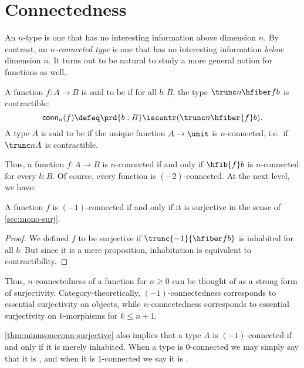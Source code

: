 \section{Connectedness}
\label{sec:connectivity}

An $n$-type is one that has no interesting information above dimension $n$.
By contrast, an \emph{$n$-connected type} is one that has no interesting information \emph{below} dimension $n$.
It turns out to be natural to study a more general notion for functions as well.

\begin{defn}
A function $f:A\to B$ is said to be 
%
%
if for all $b:B$, the type $\trunc n{\hfiber f b}$ is contractible:
\begin{equation*}
  \mathsf{conn}_n(f)\defeq \prd{b:B}\iscontr(\trunc n{\hfiber{f}b}).
\end{equation*}
A type $A$ is said to be 
%
%
 if the unique function $A\to\unit$ is $n$-connected, i.e.\ if $\trunc nA$ is contractible.
\end{defn}

Thus, a function $f:A\to B$ is $n$-connected if and only if $\hfib{f}b$ is $n$-connected for every $b:B$.
Of course, every function is $(-2)$-connected.
At the next level, we have:

\begin{lem}\label{thm:minusoneconn-surjective}
  A function $f$ is $(-1)$-connected if and only if it is surjective in the sense of \cref{sec:mono-surj}.
\end{lem}
\begin{proof}
  We defined $f$ to be surjective if $\trunc{-1}{\hfiber f b}$ is inhabited for all $b$.
  But since it is a mere proposition, inhabitation is equivalent to contractibility.
\end{proof}

Thus, $n$-connectedness of a function for $n\ge 0$ can be thought of as a strong form of surjectivity.
Category-theoretically, $(-1)$-connectedness corresponds to essential surjectivity on objects, while $n$-connectedness corresponds to essential surjectivity on $k$-morphisms for $k\le n+1$.

\cref{thm:minusoneconn-surjective} also implies that a type $A$ is $(-1)$-connected if and only if it is merely inhabited.
When a type is $0$-connected we may simply say that it is ,
%
%
and when it is $1$-connected we say it is .
%
%

